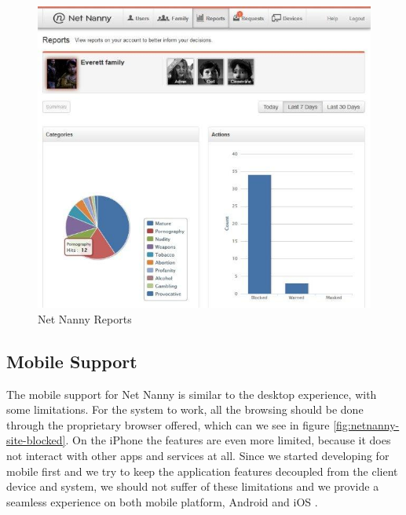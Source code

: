 \begin{figure}[th]
\centering
\includegraphics[width=1\textwidth]{Figures/netnanny-summary-report}
\decoRule
\caption{Net Nanny Reports}
\label{fig:netnanny-summary-report}
\end{figure}

\subsection{Mobile Support}

The mobile support for Net Nanny is similar to the desktop experience, with some limitations. For the system to work, all the browsing should be done through the proprietary browser offered, which can we see in figure \ref{fig:netnanny-site-blocked}. On the iPhone the features are even more limited, because it does not interact with other apps and services at all. Since we started developing for mobile first and we try to keep the application features decoupled from the client device and system, we should not suffer of these limitations and we provide a seamless experience on both mobile platform, Android and iOS \citep{netNannyPCMag}.


